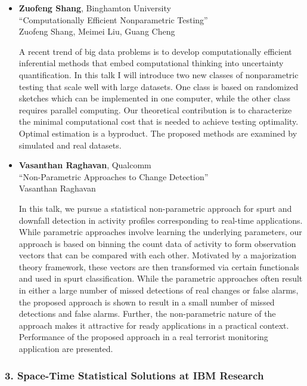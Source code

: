 \begin{itemize}
\item \textbf{Zuofeng Shang}, Binghamton University \\
``Computationally Efficient Nonparametric Testing'' \\
Zuofeng Shang, Meimei Liu, Guang Cheng


A recent trend of big data problems is to develop computationally efficient inferential methods that embed computational thinking into uncertainty quantification. In this talk I will introduce two new classes of nonparametric testing that scale well with large datasets. One class is based on randomized sketches which can be implemented in one computer, while the other class requires parallel computing. Our theoretical contribution is to characterize the minimal computational cost that is needed to achieve testing optimality. Optimal estimation is a byproduct. The proposed methods are examined by simulated and real datasets.

\item \textbf{Vasanthan Raghavan}, Qualcomm \\
``Non-Parametric Approaches to Change Detection'' \\
Vasanthan Raghavan


In this talk, we pursue a statistical non-parametric approach for spurt and downfall detection in activity profiles corresponding to real-time applications. While parametric approaches involve learning the underlying parameters, our approach is based on binning the count data of activity to form observation vectors that can be compared with each other. Motivated by a majorization theory framework, these vectors are then transformed via certain functionals and used in spurt classification. While the parametric approaches often result in either a large number of missed detections of real changes or false alarms, the proposed approach is shown to result in a small number of missed detections and false alarms. Further, the non-parametric nature of the approach 
makes it attractive for ready applications in a practical context. Performance of the proposed approach in a real terrorist monitoring application are presented. 

\end{itemize}

\subsubsection*{3. Space-Time Statistical Solutions at IBM Research}

